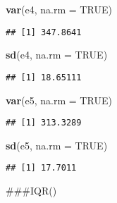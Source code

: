\documentclass[
]{article}
\newenvironment{Shaded}{\begin{snugshade}}{\end{snugshade}}
\newcommand{\AttributeTok}[1]{\textcolor[rgb]{0.13,0.29,0.53}{#1}}
\newcommand{\ConstantTok}[1]{\textcolor[rgb]{0.56,0.35,0.01}{#1}}
\newcommand{\FunctionTok}[1]{\textcolor[rgb]{0.13,0.29,0.53}{\textbf{#1}}}
\newcommand{\NormalTok}[1]{#1}
\begin{document}
\begin{Shaded}
\begin{Highlighting}[]
\FunctionTok{var}\NormalTok{(e4, }\AttributeTok{na.rm =} \ConstantTok{TRUE}\NormalTok{)}
\end{Highlighting}
\end{Shaded}

\begin{verbatim}
## [1] 347.8641
\end{verbatim}

\begin{Shaded}
\begin{Highlighting}[]
\FunctionTok{sd}\NormalTok{(e4, }\AttributeTok{na.rm =} \ConstantTok{TRUE}\NormalTok{)}
\end{Highlighting}
\end{Shaded}

\begin{verbatim}
## [1] 18.65111
\end{verbatim}

\begin{Shaded}
\begin{Highlighting}[]
\FunctionTok{var}\NormalTok{(e5, }\AttributeTok{na.rm =} \ConstantTok{TRUE}\NormalTok{)}
\end{Highlighting}
\end{Shaded}

\begin{verbatim}
## [1] 313.3289
\end{verbatim}

\begin{Shaded}
\begin{Highlighting}[]
\FunctionTok{sd}\NormalTok{(e5, }\AttributeTok{na.rm =} \ConstantTok{TRUE}\NormalTok{)}
\end{Highlighting}
\end{Shaded}

\begin{verbatim}
## [1] 17.7011
\end{verbatim}

\#\#\#IQR()
\end{document}
